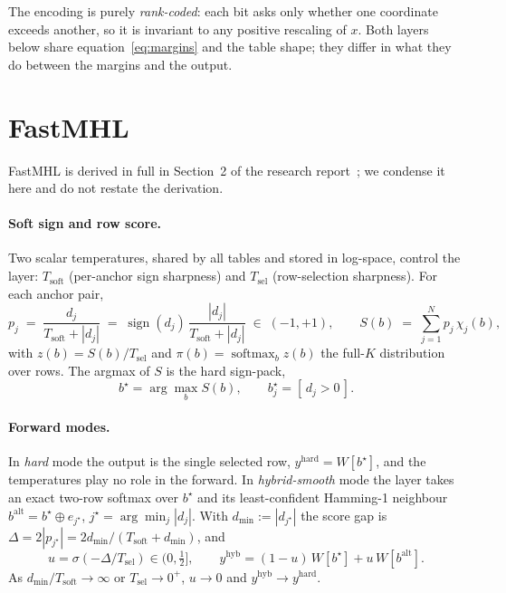 \documentclass[11pt]{article}
\newcommand{\NAP}{N}
\newcommand{\sgn}{\operatorname{sign}}
\newcommand{\Rows}{K}
\begin{document}
The encoding is purely \emph{rank-coded}: each bit asks only whether one coordinate
exceeds another, so it is invariant to any positive rescaling of $x$. Both layers below
share equation~\eqref{eq:margins} and the table shape; they differ in what they do
between the margins and the output.

\section{FastMHL}

FastMHL is derived in full in Section~2 of the research report~\cite{lutgpt}; we condense
it here and do not restate the derivation.

\paragraph{Soft sign and row score.}
Two scalar temperatures, shared by all tables and stored in log-space, control the layer:
$T_{\text{soft}}$ (per-anchor sign sharpness) and $T_{\text{sel}}$ (row-selection
sharpness). For each anchor pair,
\begin{equation}
  p_j \;=\; \frac{d_j}{T_{\text{soft}}+|d_j|}
        \;=\; \sgn(d_j)\,\frac{|d_j|}{T_{\text{soft}}+|d_j|} \;\in\;(-1,+1),
  \qquad
  S(b) \;=\; \sum_{j=1}^{\NAP} p_j\,\chi_j(b),
\end{equation}
with $z(b)=S(b)/T_{\text{sel}}$ and $\pi(b)=\operatorname{softmax}_b z(b)$ the full-$\Rows$
distribution over rows. The argmax of $S$ is the hard sign-pack,
\begin{equation}
  b^\star = \arg\max_b S(b), \qquad b^\star_j = [\,d_j>0\,].
  \label{eq:bstar}
\end{equation}

\paragraph{Forward modes.}
In \emph{hard} mode the output is the single selected row, $y^{\text{hard}}=W[b^\star]$,
and the temperatures play no role in the forward. In \emph{hybrid-smooth} mode the layer
takes an exact two-row softmax over $b^\star$ and its least-confident Hamming-1 neighbour
$b^{\text{alt}}=b^\star\oplus e_{j^\star}$, $j^\star=\arg\min_j|d_j|$. With
$d_{\min}:=|d_{j^\star}|$ the score gap is
$\Delta = 2|p_{j^\star}| = 2d_{\min}/(T_{\text{soft}}+d_{\min})$, and
\begin{equation}
  u=\sigma\!\left(-\Delta/T_{\text{sel}}\right)\in(0,\tfrac12],
  \qquad
  y^{\text{hyb}} = (1-u)\,W[b^\star] + u\,W[b^{\text{alt}}].
\end{equation}
As $d_{\min}/T_{\text{soft}}\to\infty$ or $T_{\text{sel}}\to0^+$, $u\to0$ and
$y^{\text{hyb}}\to y^{\text{hard}}$.
\end{document}
